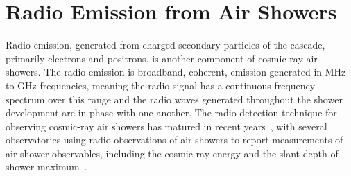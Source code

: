 






\section{Radio Emission from Air Showers}\label{sec:radio}
Radio emission, generated from charged secondary particles of the cascade, primarily electrons and positrons, is another component of cosmic-ray air showers.
The radio emission is broadband, coherent, emission generated in MHz to GHz frequencies, meaning the radio signal has a continuous frequency spectrum over this range and the radio waves generated throughout the shower development are in phase with one another.
The radio detection technique for observing cosmic-ray air showers has matured in recent years~\cite{schroeder_ppnp2017_radio,tim_physrep2016_radio}, with several observatories using radio observations of air showers to report measurements of air-shower observables, including the cosmic-ray energy and the slant depth of shower maximum~\cite{tunkarex_jcap2015_radiomeasurements,maxbuesken_phdthesis,auger_prd2024_aeraxmax,auger_prl2024_aeraxmax}.

